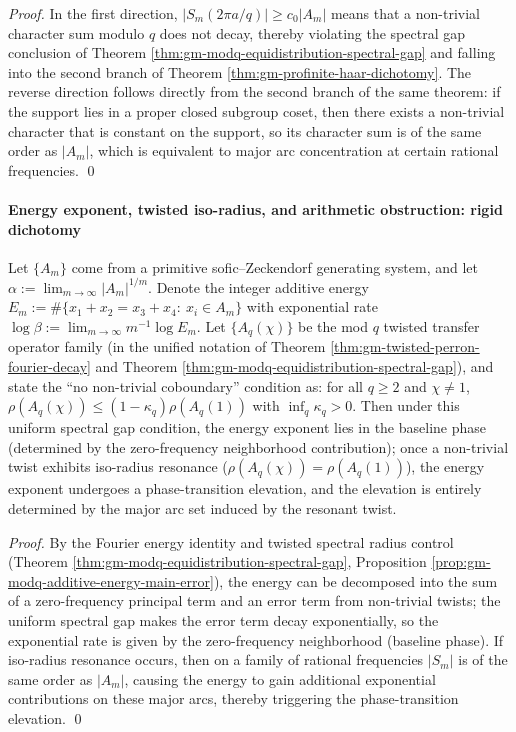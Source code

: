 \begin{proof}
In the first direction, \(|S_m(2\pi a/q)|\ge c_0|A_m|\) means that a non-trivial character sum modulo \(q\) does not decay, thereby violating the spectral gap conclusion of Theorem \ref{thm:gm-modq-equidistribution-spectral-gap} and falling into the second branch of Theorem \ref{thm:gm-profinite-haar-dichotomy}.
The reverse direction follows directly from the second branch of the same theorem: if the support lies in a proper closed subgroup coset, then there exists a non-trivial character that is constant on the support, so its character sum is of the same order as \(|A_m|\), which is equivalent to major arc concentration at certain rational frequencies. \qed
\end{proof}

\paragraph{Energy exponent, twisted iso-radius, and arithmetic obstruction: rigid dichotomy}
\begin{theorem}\label{thm:gm-energy-exponent-twist-criterion}
Let \(\{A_m\}\) come from a primitive sofic--Zeckendorf generating system, and let \(\alpha:=\lim_{m\to\infty}|A_m|^{1/m}\).
Denote the integer additive energy
\(
E_m:=\#\{x_1+x_2=x_3+x_4:\ x_i\in A_m\}
\)
with exponential rate \(\log\beta:=\lim_{m\to\infty}m^{-1}\log E_m\).
Let \(\{A_q(\chi)\}\) be the mod \(q\) twisted transfer operator family (in the unified notation of Theorem \ref{thm:gm-twisted-perron-fourier-decay} and Theorem \ref{thm:gm-modq-equidistribution-spectral-gap}), and state the ``no non-trivial coboundary'' condition as: for all \(q\ge 2\) and \(\chi\ne 1\), \(\rho(A_q(\chi))\le (1-\kappa_q)\rho(A_q(1))\) with \(\inf_q\kappa_q>0\).
Then under this uniform spectral gap condition, the energy exponent lies in the baseline phase (determined by the zero-frequency neighborhood contribution); once a non-trivial twist exhibits iso-radius resonance (\(\rho(A_q(\chi))=\rho(A_q(1))\)), the energy exponent undergoes a phase-transition elevation, and the elevation is entirely determined by the major arc set induced by the resonant twist.
\end{theorem}

\begin{proof}
By the Fourier energy identity and twisted spectral radius control (Theorem \ref{thm:gm-modq-equidistribution-spectral-gap}, Proposition \ref{prop:gm-modq-additive-energy-main-error}), the energy can be decomposed into the sum of a zero-frequency principal term and an error term from non-trivial twists; the uniform spectral gap makes the error term decay exponentially, so the exponential rate is given by the zero-frequency neighborhood (baseline phase).
If iso-radius resonance occurs, then on a family of rational frequencies \(|S_m|\) is of the same order as \(|A_m|\), causing the energy to gain additional exponential contributions on these major arcs, thereby triggering the phase-transition elevation. \qed
\end{proof}

